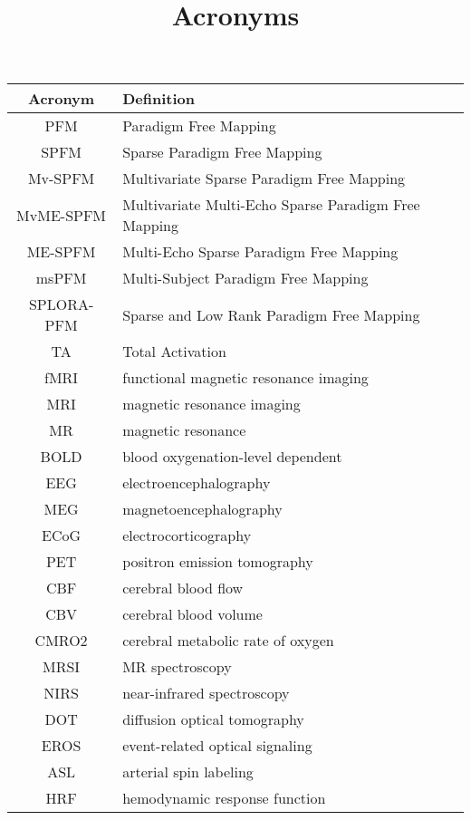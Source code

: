 \title{Acronyms}

\begin{table}[h]
    \centering
    \begin{tabular}{|c|p{}|}
    \hline
    \textbf{Acronym} & \textbf{Definition} \\
    \hline
    PFM & Paradigm Free Mapping \\
    \hline
    SPFM & Sparse Paradigm Free Mapping \\
    \hline
    Mv-SPFM & Multivariate Sparse Paradigm Free Mapping \\
    \hline
    MvME-SPFM & Multivariate Multi-Echo Sparse Paradigm Free Mapping \\
    \hline
    ME-SPFM & Multi-Echo Sparse Paradigm Free Mapping \\
    \hline
    msPFM & Multi-Subject Paradigm Free Mapping \\
    \hline
    SPLORA-PFM & Sparse and Low Rank Paradigm Free Mapping \\
    \hline
    TA & Total Activation \\
    \hline
    fMRI & functional magnetic resonance imaging \\
    \hline
    MRI & magnetic resonance imaging \\
    \hline
    MR & magnetic resonance \\
    \hline
    BOLD & blood oxygenation-level dependent \\
    \hline
    EEG & electroencephalography \\
    \hline
    MEG & magnetoencephalography \\
    \hline
    ECoG & electrocorticography \\
    \hline
    PET & positron emission tomography \\
    \hline
    CBF & cerebral blood flow \\
    \hline
    CBV & cerebral blood volume \\
    \hline
    CMRO2 & cerebral metabolic rate of oxygen \\
    \hline
    MRSI & MR spectroscopy \\
    \hline
    NIRS & near-infrared spectroscopy \\
    \hline
    DOT & diffusion optical tomography \\
    \hline
    EROS & event-related optical signaling \\
    \hline
    ASL & arterial spin labeling \\
    \hline
    HRF & hemodynamic response function \\

\end{tabular}
\end{table}
